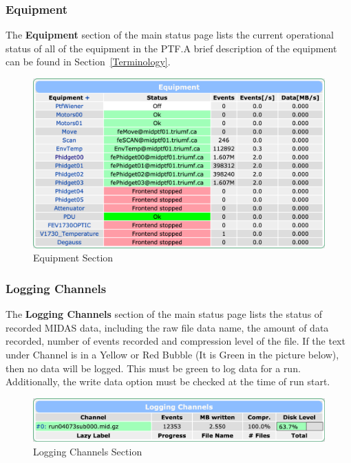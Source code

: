 \documentclass[twoside,letterpaper]{refart}
\begin{document}
\FloatBarrier

\subsubsection{Equipment}

The \textbf{Equipment} section of the main status page lists the current operational status of all of the equipment in the PTF.\@ A brief description of the equipment can be found in Section~\ref{Terminology}.

\FloatBarrier

\begin{figure}[!htpb]\centering	
	\includegraphics[width=\textwidth]{images/equipment.png}
	\caption{Equipment Section\label{equipment}}
\end{figure}

\FloatBarrier

\subsubsection{Logging Channels}

The \textbf{Logging Channels} section of the main status page lists the status of recorded MIDAS data, including the raw file data name, the amount of data recorded, number of events recorded and compression level of the file. If the text under Channel is in a Yellow or Red Bubble (It is Green in the picture below), then no data will be logged. This must be green to log data for a run. Additionally, the write data option must be checked at the time of run start.

\FloatBarrier

\begin{figure}[!htpb]\centering	
	\includegraphics[width=\textwidth]{images/loggingChannels.png}
	\caption{Logging Channels Section\label{loggingChannels}}
\end{figure}
\end{document}
